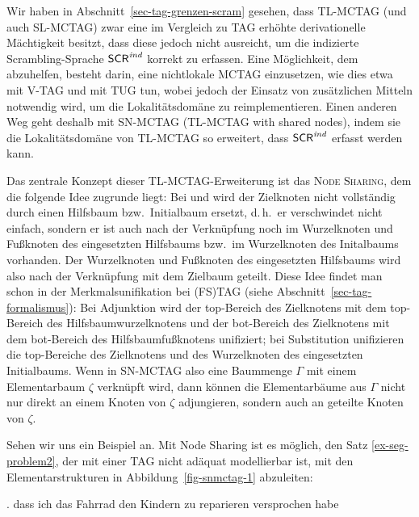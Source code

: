 Wir haben in Abschnitt~\ref{sec-tag-grenzen-scram} gesehen, dass TL-MCTAG (und auch SL-MCTAG) zwar eine im Vergleich zu TAG erhöhte derivationelle Mächtigkeit besitzt, dass diese jedoch nicht ausreicht, um die indizierte Scrambling-Sprache  $\mathsf{SCR}^{\mathit{ind}}$ korrekt zu erfassen. Eine Möglichkeit, dem abzuhelfen, besteht darin, eine nichtlokale MCTAG einzusetzen, wie dies etwa \cite{Rambow:94} mit V-TAG und \cite{Gerdes:04} mit TUG tun, wobei jedoch der Einsatz von zusätzlichen Mitteln notwendig wird, um die Lokalitätsdomäne zu reimplementieren. Einen anderen Weg geht deshalb \cite{Kallmeyer:05} mit SN-MCTAG (TL-MCTAG with shared nodes), indem sie die Lokalitätsdomäne von TL-MCTAG so erweitert, dass $\mathsf{SCR}^{\mathit{ind}}$ erfasst werden kann. 

\largerpage%
Das zentrale Konzept dieser TL-MCTAG-Erweiterung ist das \textsc{Node Sharing}, dem die folgende Idee zugrunde liegt: Bei  und  wird der Zielknoten nicht vollständig durch einen Hilfsbaum bzw.\ Initialbaum ersetzt, d.\,h.\ er verschwindet nicht einfach, sondern er ist auch nach der Verknüpfung noch im Wurzelknoten und Fu\ss knoten des eingesetzten Hilfsbaums bzw.\ im Wurzelknoten des Initalbaums vorhanden. Der Wurzelknoten und Fu\ss knoten des eingesetzten Hilfsbaums wird also nach der Verknüpfung mit dem Zielbaum geteilt. Diese Idee findet man schon in der Merkmalsunifikation bei (FS)TAG (siehe Abschnitt~\ref{sec-tag-formalismus}): Bei Adjunktion wird der {\sc top}-Bereich des Zielknotens mit dem {\sc top}-Bereich des Hilfsbaumwurzelknotens und der {\sc bot}-Bereich des Zielknotens mit dem {\sc bot}-Bereich des Hilfsbaumfu\ss knotens unifiziert; bei Substitution unifizieren die {\sc top}-Bereiche des Zielknotens und des Wurzelknoten des eingesetzten Initialbaums. Wenn in SN-MCTAG also eine Baummenge $\Gamma$ mit einem Elementarbaum $\zeta$ verknüpft wird, dann können die Elementarbäume aus $\Gamma$ nicht nur direkt an einem Knoten von $\zeta$ adjungieren, sondern auch an geteilte Knoten von $\zeta$.
\largerpage%

Sehen wir uns ein Beispiel an. Mit Node Sharing ist es möglich, den Satz \ref{ex-seg-problem2}, der mit einer TAG nicht adäquat modellierbar ist, mit den Elementarstrukturen in Abbildung~\ref{fig-snmctag-1} abzuleiten: 

\ex. dass ich das Fahrrad den Kindern zu reparieren versprochen habe \label{ex-seg-problem2}

